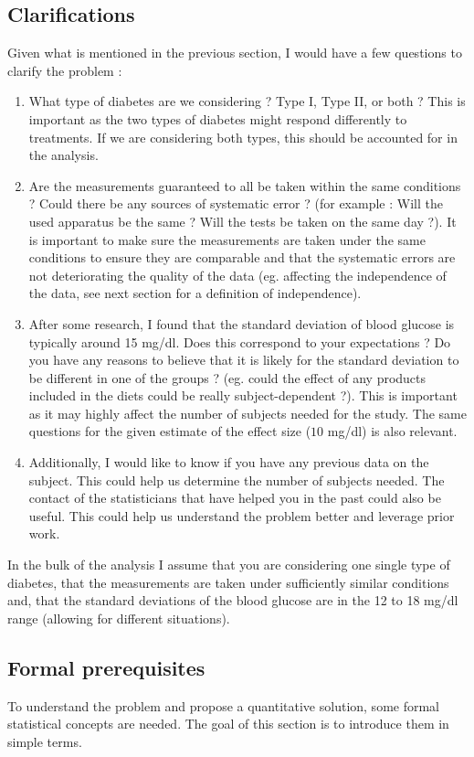 \documentclass[a4paper, 12pt,oneside]{article}
\begin{document}
	\subsection{Clarifications}
	Given what is mentioned in the previous section, I would have a few questions to clarify the problem :
	\begin{enumerate}
		\item What type of diabetes are we considering ? Type I, Type II, or both ? This is important as the two types of diabetes might respond differently to treatments. If we are considering both types, this should be accounted for in the analysis. 
		\item Are the measurements guaranteed to all be taken within the same conditions ? Could there be any sources of systematic error ? (for example : Will the used apparatus be the same ? Will the tests be taken on the same day ?). It is important to make sure the measurements are taken under the same conditions to ensure they are comparable and that the systematic errors are not deteriorating the quality of the data (eg. affecting the independence of the data, see next section for a definition of independence). 
		\item After some research, I found that the standard deviation of blood glucose is typically around 15 mg/dl. Does this correspond to your expectations ? Do you have any reasons to believe that it is likely for the standard deviation to be different in one of the groups ? (eg. could the effect of any products included in the diets could be really subject-dependent ?). This is important as it may highly affect the number of subjects needed for the study. The same questions for the given estimate of the effect size ($10$ mg/dl) is also relevant.
		\item Additionally, I would like to know if you have any previous data on the subject. This could help us determine the number of subjects needed. The contact of the statisticians that have helped you in the past could also be useful. This could help us understand the problem better and leverage prior work.
	\end{enumerate}
	In the bulk of the analysis I assume that you are considering one single type of diabetes, that the measurements are taken under sufficiently similar conditions and, that the standard deviations of the blood glucose are in the 12 to 18 mg/dl range (allowing for different situations).
	\subsection{Formal prerequisites}
	To understand the problem and propose a quantitative solution, some formal statistical concepts are needed. The goal of this section is to introduce them in simple terms.
\end{document}
